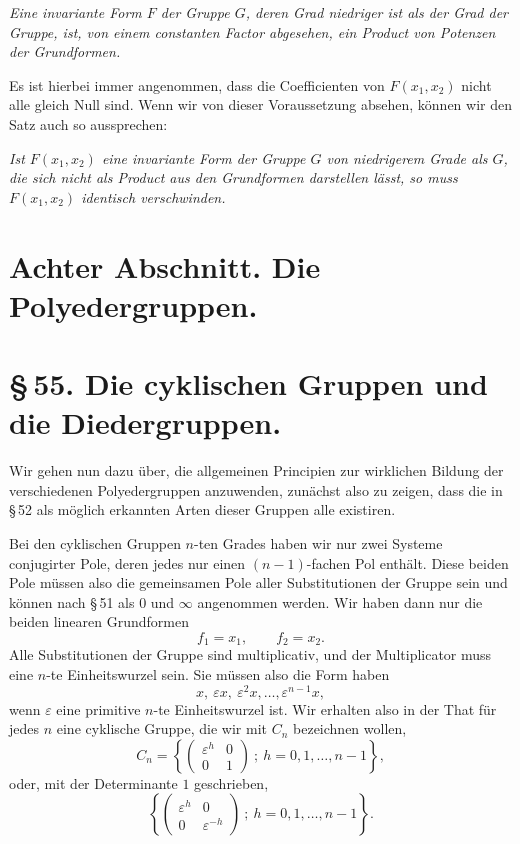 \documentclass[11pt]{article}
\providecommand{\eps}{\varepsilon}
\providecommand{\eps}{\varepsilon}
\providecommand{\mat}[4]{\begin{pmatrix}#1&#2\\#3&#4\end{pmatrix}}
\providecommand{\mat}[4]{\begin{pmatrix}#1&#2\\#3&#4\end{pmatrix}}
\begin{document}
\emph{Eine invariante Form $F$ der Gruppe $G$, deren Grad niedriger ist als der Grad der Gruppe, ist, von einem constanten Factor abgesehen, ein Product von Potenzen der Grundformen.}

Es ist hierbei immer angenommen, dass die Coefficienten von $F(x_1,x_2)$ nicht alle gleich Null sind. Wenn wir von dieser Voraussetzung absehen, können wir den Satz auch so aussprechen:

\emph{Ist $F(x_1,x_2)$ eine invariante Form der Gruppe $G$ von niedrigerem Grade als $G$, die sich nicht als Product aus den Grundformen darstellen lässt, so muss $F(x_1,x_2)$ identisch verschwinden.}

\clearpage

\clearpage
\section*{Achter Abschnitt. Die Polyedergruppen.}

\section*{\S\,55. Die cyklischen Gruppen und die Diedergruppen.}

Wir gehen nun dazu über, die allgemeinen Principien zur wirklichen Bildung der verschiedenen Polyedergruppen anzuwenden, zunächst also zu zeigen, dass die in \S\,52 als möglich erkannten Arten dieser Gruppen alle existiren.

Bei den cyklischen Gruppen $n$-ten Grades haben wir nur zwei Systeme conjugirter Pole, deren jedes nur einen $(n-1)$-fachen Pol enthält. Diese beiden Pole müssen also die gemeinsamen Pole aller Substitutionen der Gruppe sein und können nach \S\,51 als $0$ und $\infty$ angenommen werden. Wir haben dann nur die beiden linearen Grundformen
\begin{equation}
 f_1=x_1,\qquad f_2=x_2 .
\tag{1}
\end{equation}
Alle Substitutionen der Gruppe sind multiplicativ, und der Multiplicator muss eine $n$-te Einheitswurzel sein. Sie müssen also die Form haben
\begin{equation}
 x,\ \eps x,\ \eps^2x,\ldots,\eps^{n-1}x,
\tag{2}
\end{equation}
wenn $\eps$ eine primitive $n$-te Einheitswurzel ist. Wir erhalten also in der That für jedes $n$ eine cyklische Gruppe, die wir mit $C_n$ bezeichnen wollen,
\begin{equation}
 C_n=\left\{\mat{\eps^h}{0}{0}{1}\ ;\ h=0,1,\ldots,n-1\right\},
\tag{3}
\end{equation}
oder, mit der Determinante $1$ geschrieben,
\[
 \left\{\mat{\eps^h}{0}{0}{\eps^{-h}}\ ;\ h=0,1,\ldots,n-1\right\}.
\]
\end{document}
